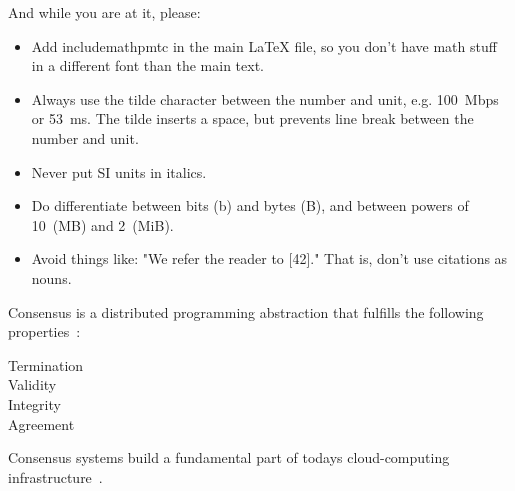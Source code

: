 
And while you are at it, please:

\begin{itemize}
\item Add include{mathpmtc} in the main LaTeX file, so you don't have
math stuff in a different font than the main text. 

\item Always use the tilde character between the number and unit, e.g. 100~Mbps or 53~ms. 
The tilde inserts a space, but prevents line break between the number and unit.

\item Never put SI units in italics. 

\item Do differentiate between bits (b) and bytes (B), and between powers of 10~(MB) and 2~(MiB).

\item Avoid things like: "We refer the reader to [42]." That is, don't use citations as nouns.
\end{itemize}


\begin{example}
\label{def:consensus}
Consensus is a distributed programming abstraction that fulfills the following properties~\cite{aTextbook}:
\begin{description}
\item[Termination]
\item[Validity]
\item[Integrity]
\item[Agreement]
\end{description}
\end{example}

\noindent
\begin{example}
\label{ex:trend} Consensus systems build a fundamental part of todays cloud-computing infrastructure~\cite{spanner,chubby,zookeeper,zookeeperWeb}.
\end{example}

